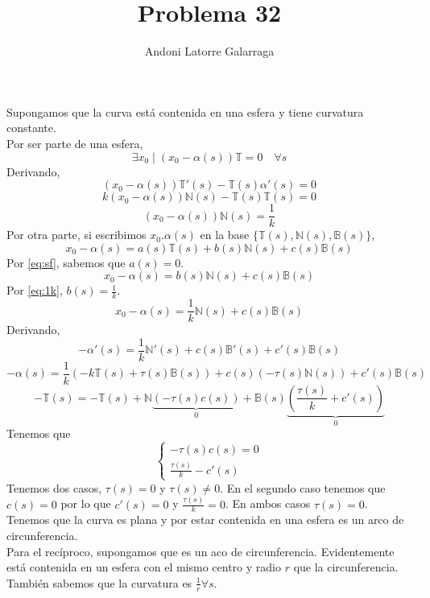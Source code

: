 \documentclass{article}
\title{Problema 32}
\author{Andoni Latorre Galarraga}
\date{}
\newcommand{\bb}[1]{\mathbb{#1}}
\begin{document}
\setlength{\parindent}{0cm}
\maketitle
Supongamos que la curva está contenida en una esfera y tiene curvatura constante.\\
Por ser parte de una esfera,
\begin{equation}\label{eq:sf}
\exists x_0 \mid (x_0-\alpha(s))\bb{T}=0 \quad \forall s
\end{equation}
Derivando,
$$
(x_0-\alpha(s))\bb{T}'(s)-\bb{T}(s)\alpha'(s)=0
$$
$$
k(x_0-\alpha(s))\bb{N}(s)-\bb{T}(s)\bb{T}(s)=0
$$
\begin{equation}\label{eq:1k}
(x_0-\alpha(s))\bb{N}(s)=\frac{1}{k}
\end{equation}
Por otra parte, si escribimos $x_0.\alpha(s)$ en la base $\{\bb{T}(s),\bb{N}(s),\bb{B}(s)\}$,
$$
x_0-\alpha(s)=a(s)\bb{T}(s)+b(s)\bb{N}(s)+c(s)\bb{B}(s)
$$
Por \eqref{eq:sf}, sabemos que $a(s)=0$.
$$
x_0-\alpha(s)=b(s)\bb{N}(s)+c(s)\bb{B}(s)
$$
Por \eqref{eq:1k}, $b(s)=\frac{1}{k}$.
$$
x_0-\alpha(s)=\frac{1}{k}\bb{N}(s)+c(s)\bb{B}(s)
$$
Derivando,
$$
-\alpha'(s)=\frac{1}{k}\bb{N}'(s)+c(s)\bb{B}'(s)+c'(s)\bb{B}(s)
$$
$$
-\alpha(s)=\frac{1}{k}(-k\bb{T}(s)+\tau(s)\bb{B}(s))+c(s)(-\tau(s)\bb{N}(s))+c'(s)\bb{B}(s)
$$
$$
-\bb{T}(s)=-\bb{T}(s)+\bb{N}\underbrace{(-\tau(s)c(s))}_0+\bb{B}(s)\underbrace{\left( \frac{\tau(s)}{k}+c'(s) \right)}_0
$$
Tenemos que
$$
\left\{
    \begin{array}{c}
        -\tau(s)c(s)=0 \\
        \frac{\tau(s)}{k}-c'(s)
    \end{array}\right.
$$
Tenemos dos casos, $\tau(s)=0$ y $\tau(s)\ne0$. En el segundo caso tenemos que $c(s)=0$ por lo que $c'(s)=0$ y $\frac{\tau(s)}{k}=0$. En ambos casos $\tau(s)=0$. Tenemos que la curva es plana y por estar contenida en una esfera es un arco de circunferencia.\\
Para el recíproco, supongamos que es un aco de circunferencia. Evidentemente está contenida en un esfera con el mismo centro y radio $r$ que la circunferencia. También sabemos que la curvatura es $\frac{1}{r}\forall s$.
\end{document}
